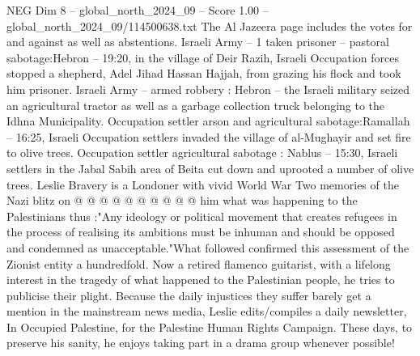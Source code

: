 \begin{textsample}{NEG Dim 8 – global\_north\_2024\_09 – Score 1.00 – global\_north\_2024\_09/114500638.txt}
The Al Jazeera page includes the votes for and against as well as abstentions.
Israeli Army -- 1 taken prisoner -- pastoral sabotage:Hebron -- 19:20, in the village of Deir Razih, Israeli Occupation forces stopped a shepherd, Adel Jihad Hassan Hajjah, from grazing his flock and took him prisoner.
Israeli Army -- armed robbery : Hebron -- the Israeli military seized an agricultural tractor as well as a garbage collection truck belonging to the Idhna Municipality.
Occupation settler arson and agricultural sabotage:Ramallah -- 16:25, Israeli Occupation settlers invaded the village of al-Mughayir and set fire to olive trees.
Occupation settler agricultural sabotage : Nablus -- 15:30, Israeli settlers in the Jabal Sabih area of Beita cut down and uprooted a number of olive trees.
Leslie Bravery is a Londoner with vivid World War Two memories of the Nazi blitz on @ @ @ @ @ @ @ @ @ @ him what was happening to the Palestinians thus :"Any ideology or political movement that creates refugees in the process of realising its ambitions must be inhuman and should be opposed and condemned as unacceptable."What followed confirmed this assessment of the Zionist entity a hundredfold.
Now a retired flamenco guitarist, with a lifelong interest in the tragedy of what happened to the Palestinian people, he tries to publicise their plight.
Because the daily injustices they suffer barely get a mention in the mainstream news media, Leslie edits/compiles a daily newsletter, In Occupied Palestine, for the Palestine Human Rights Campaign.
These days, to preserve his sanity, he enjoys taking part in a drama group whenever possible!

\end{textsample}
